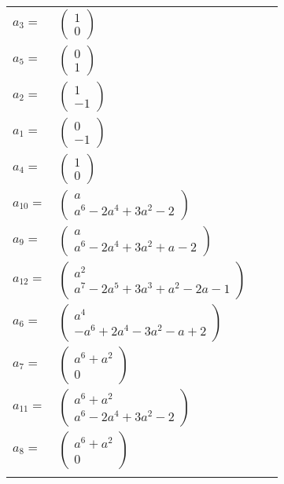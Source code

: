 \documentclass[1p]{elsarticle_modified}
\theoremstyle{definition}
\begin{document}
\begin{tabular}{m{7pt} m{180pt} m{7pt} m{180pt} }
\flushright $a_{3}=$&$\begin{pmatrix}1\\0\end{pmatrix}$ \\
\flushright $a_{5}=$&$\begin{pmatrix}0\\1\end{pmatrix}$ \\
\flushright $a_{2}=$&$\begin{pmatrix}1\\-1\end{pmatrix}$ \\
\flushright $a_{1}=$&$\begin{pmatrix}0\\-1\end{pmatrix}$ \\
\flushright $a_{4}=$&$\begin{pmatrix}1\\0\end{pmatrix}$ \\
\flushright $a_{10}=$&$\begin{pmatrix}a\\a^6-2 a^4+3 a^2-2\end{pmatrix}$ \\
\flushright $a_{9}=$&$\begin{pmatrix}a\\a^6-2 a^4+3 a^2+a-2\end{pmatrix}$ \\
\flushright $a_{12}=$&$\begin{pmatrix}a^2\\a^7-2 a^5+3 a^3+a^2-2 a-1\end{pmatrix}$ \\
\flushright $a_{6}=$&$\begin{pmatrix}a^4\\- a^6+2 a^4-3 a^2- a+2\end{pmatrix}$ \\
\flushright $a_{7}=$&$\begin{pmatrix}a^6+a^2\\0\end{pmatrix}$ \\
\flushright $a_{11}=$&$\begin{pmatrix}a^6+a^2\\a^6-2 a^4+3 a^2-2\end{pmatrix}$ \\
\flushright $a_{8}=$&$\begin{pmatrix}a^6+a^2\\0\end{pmatrix}$\\&\end{tabular}
\end{document}
